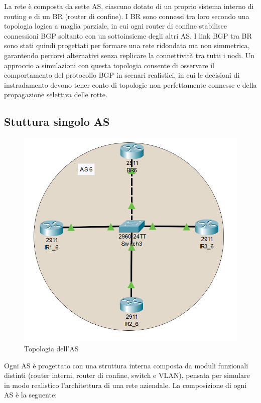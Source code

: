 \documentclass[12pt,a4paper,twoside]{book}
\begin{document}
La rete è composta da sette \ac{AS}, ciascuno dotato di un proprio sistema interno di routing e di un \ac{BR} (router di confine). I \ac{BR} sono connessi tra loro secondo una topologia logica a maglia parziale, in cui ogni router di confine stabilisce connessioni \ac{BGP} soltanto con un sottoinsieme degli altri \ac{AS}.
I link \ac{BGP} tra \ac{BR} sono stati quindi progettati per formare una rete ridondata ma non simmetrica, garantendo percorsi alternativi senza replicare la connettività tra tutti i nodi.
Un approccio a simulazioni con questa topologia consente di osservare il comportamento del protocollo \ac{BGP} in scenari realistici, in cui le decisioni di instradamento devono tener conto di topologie non perfettamente connesse e della propagazione selettiva delle rotte.

\subsection{Stuttura singolo AS}
\begin{figure}[H]
    \centering
    \includegraphics[width=.8\linewidth]{img/topologia_as.png}
    \caption{Topologia dell'AS}
    \label{fig:topologia_as}
\end{figure}
Ogni \ac{AS} è progettato con una struttura interna composta da moduli funzionali distinti (router interni, router di confine, switch e VLAN), pensata per simulare in modo realistico l’architettura di una rete aziendale. La composizione di ogni \ac{AS} è la seguente:
\end{document}
